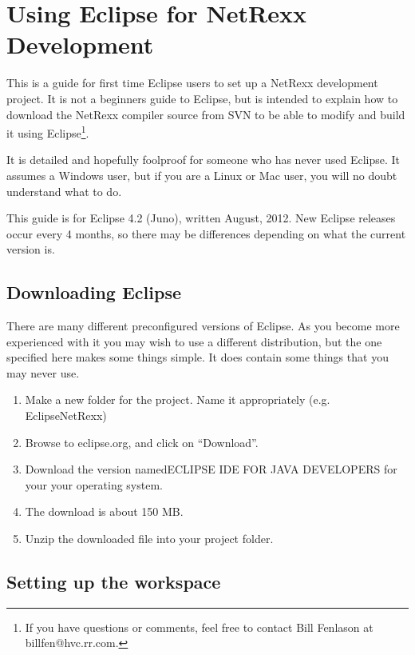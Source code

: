 \chapter{Using Eclipse for NetRexx Development}\label{setupeclipse}
 
This is a guide for first time Eclipse users to set up a NetRexx
development project.  It is not a beginners guide to Eclipse, but is
intended to explain how to download the NetRexx compiler source from
SVN to be able to modify and build it using Eclipse\footnote{If you
  have questions or comments, feel free to contact Bill Fenlason at billfen@hvc.rr.com.}.
 
It is detailed and hopefully foolproof for someone who has never used
Eclipse.  It assumes a Windows user, but if you are a Linux or Mac
user, you will no doubt understand what to do.
 
This guide is for Eclipse 4.2 (Juno), written August, 2012.  New
Eclipse releases occur every 4 months, so there may be differences
depending on what the current version is.
 
\section{Downloading Eclipse}
 
There are many different preconfigured versions of Eclipse.  As you
become more experienced with it you may wish to use a different
distribution, but the one specified here makes some things simple.  It
does contain some things that you may never use.
\begin{enumerate}
\item Make a new folder for the project.  Name it appropriately
   (e.g. EclipseNetRexx)
\item Browse to eclipse.org, and click on ``Download''.
\item Download the version namedECLIPSE IDE FOR JAVA DEVELOPERS for your
   your operating system.
\item The download is about 150 MB.
\item Unzip the downloaded file into your project folder.
\end{enumerate}
\section{Setting up the workspace}
 
